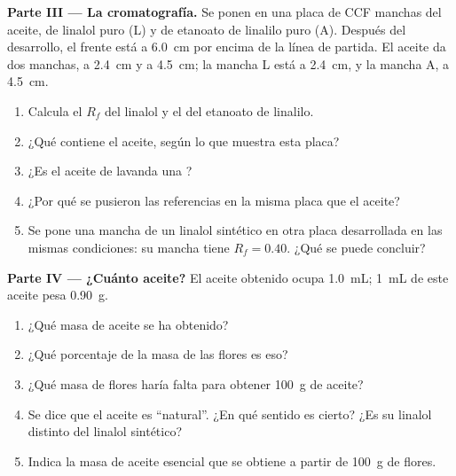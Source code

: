 \begin{problem}
\medskip
\noindent\textbf{Parte III --- La cromatografía.}
Se ponen en una placa de CCF manchas del aceite, de linalol puro (L) y
de etanoato de linalilo puro (A). Después del desarrollo, el frente está
a \qty{6.0}{cm} por encima de la línea de partida. El aceite da dos
manchas, a \qty{2.4}{cm} y a \qty{4.5}{cm}; la mancha L está a
\qty{2.4}{cm}, y la mancha A, a \qty{4.5}{cm}.
\begin{enumerate}[resume]
  \item Calcula el $R_f$ del linalol y el del etanoato de linalilo.
  \item ¿Qué contiene el aceite, según lo que muestra esta placa?
  \item ¿Es el aceite de lavanda una ?
  \item ¿Por qué se pusieron las referencias en la misma placa que el
        aceite?
  \item Se pone una mancha de un linalol sintético en otra placa
        desarrollada en las mismas condiciones: su mancha tiene
        $R_f = 0.40$. ¿Qué se puede concluir?
\end{enumerate}

\medskip
\noindent\textbf{Parte IV --- ¿Cuánto aceite?}
El aceite obtenido ocupa \qty{1.0}{mL}; \qty{1}{mL} de este aceite pesa
\qty{0.90}{g}.
\begin{enumerate}[resume]
  \item ¿Qué masa de aceite se ha obtenido?
  \item ¿Qué porcentaje de la masa de las flores es eso?
  \item ¿Qué masa de flores haría falta para obtener \qty{100}{g} de
        aceite?
  \item Se dice que el aceite es ``natural''. ¿En qué sentido es cierto?
        ¿Es su linalol distinto del linalol sintético?
  \item Indica la masa de aceite esencial que se obtiene a partir de
        \qty{100}{g} de flores.
\end{enumerate}
\end{problem}
